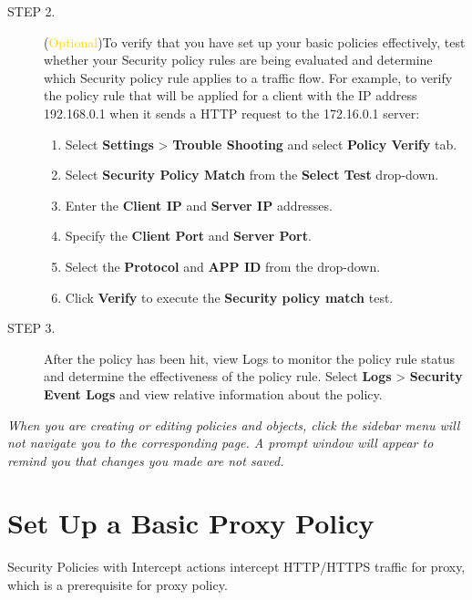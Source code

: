 \begin{description}
    \item[STEP 2.] (\textcolor{gold}{Optional})To verify that you have set up your basic policies effectively, test whether your Security policy rules are being evaluated and determine which Security policy rule applies to a traffic flow. For example, to verify the policy rule that will be applied for a client with the IP address 192.168.0.1 when it sends a HTTP request to the 172.16.0.1 server:
    \begin{enumerate} 
        \item Select \textbf{Settings} > \textbf{Trouble Shooting} and select \textbf{Policy Verify} tab.
        \item	Select \textbf{Security Policy Match} from the \textbf{Select Test} drop-down. 
        \item	Enter the \textbf{Client IP} and \textbf{Server IP} addresses.
        \item	Specify the \textbf{Client Port} and \textbf{Server Port}.
        \item	Select the \textbf{Protocol} and \textbf{APP ID} from the drop-down.
        \item	Click \textbf{Verify} to execute the \textbf{Security policy match} test.    
    \end{enumerate}
    \item[STEP 3.] After the policy has been hit, view Logs to monitor the policy rule status and determine the effectiveness of the policy rule. 
    Select \textbf{Logs} > \textbf{Security Event Logs} and view relative information about the policy.
\end{description}


\notemark\textit{When you are creating or editing policies and objects, click the sidebar menu will not navigate you to the corresponding page. 
A prompt window will appear to remind you that changes you made are not saved.}


\section*{\hypertarget{link:Set Up a Basic Proxy Policy}{Set Up a Basic Proxy Policy}}
\label{sec:intro:proxy}

Security Policies with Intercept actions intercept HTTP/HTTPS traffic for proxy, which is a prerequisite for proxy policy. 


